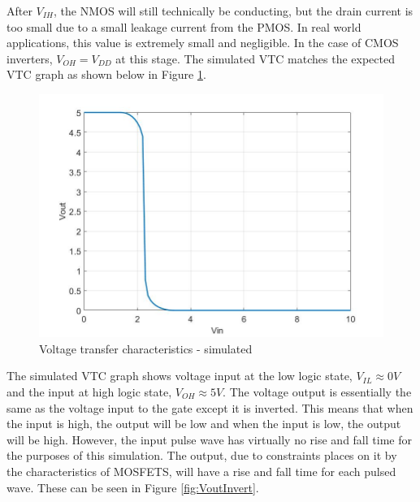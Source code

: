 After $V_{IH}$, the NMOS will still technically be conducting, but the drain current is too small due to a small leakage current from the PMOS. In real world applications, this value is extremely small and negligible. In the case of CMOS inverters, $V_{OH} = V_{DD}$ at this stage. The simulated VTC matches the expected VTC graph as shown below in Figure \ref{fig:VTCsim}.

\begin{figure}[H]
    \centering
        \centering
        \includegraphics[scale = .25]{CircuitDevelopment/cd4007SIM/cmos_vtc.jpg}
        \caption{Voltage transfer characteristics - simulated}
        \label{fig:VTCsim}
\end{figure} 

The simulated VTC graph shows voltage input at the low logic state, $V_{IL}\approx 0V$ and the input at high logic state, $V_{OH}\approx 5V$. The voltage output is essentially the same as the voltage input to the gate except it is inverted. This means that when the input is high, the output will be low and when the input is low, the output will be high. However, the input pulse wave has virtually no rise and fall time for the purposes of this simulation. The output, due to constraints places on it by the characteristics of MOSFETS, will have a rise and fall time for each pulsed wave. These can be seen in Figure \ref{fig:VoutInvert}. 

